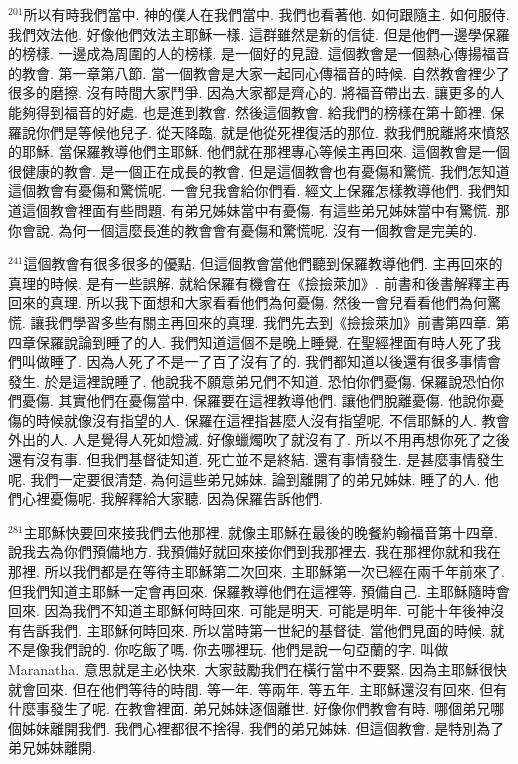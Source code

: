 \documentclass{book}
\begin{document}
$^{201}$所以有時我們當中.
神的僕人在我們當中.
我們也看著他.
如何跟隨主.
如何服侍.
我們效法他.
好像他們效法主耶穌一樣.
這群雖然是新的信徒.
但是他們一邊學保羅的榜樣.
一邊成為周圍的人的榜樣.
是一個好的見證.
這個教會是一個熱心傳揚福音的教會.
第一章第八節.
當一個教會是大家一起同心傳福音的時候.
自然教會裡少了很多的磨擦.
沒有時間大家鬥爭.
因為大家都是齊心的.
將福音帶出去.
讓更多的人能夠得到福音的好處.
也是進到教會.
然後這個教會.
給我們的榜樣在第十節裡.
保羅說你們是等候他兒子.
從天降臨.
就是他從死裡復活的那位.
救我們脫離將來憤怒的耶穌.
當保羅教導他們主耶穌.
他們就在那裡專心等候主再回來.
這個教會是一個很健康的教會.
是一個正在成長的教會.
但是這個教會也有憂傷和驚慌.
我們怎知道這個教會有憂傷和驚慌呢.
一會兒我會給你們看.
經文上保羅怎樣教導他們.
我們知道這個教會裡面有些問題.
有弟兄姊妹當中有憂傷.
有這些弟兄姊妹當中有驚慌.
那你會說.
為何一個這麼長進的教會會有憂傷和驚慌呢.
沒有一個教會是完美的.

$^{241}$這個教會有很多很多的優點.
但這個教會當他們聽到保羅教導他們.
主再回來的真理的時候.
是有一些誤解.
就給保羅有機會在《撿撿萊加》.
前書和後書解釋主再回來的真理.
所以我下面想和大家看看他們為何憂傷.
然後一會兒看看他們為何驚慌.
讓我們學習多些有關主再回來的真理.
我們先去到《撿撿萊加》前書第四章.
第四章保羅說論到睡了的人.
我們知道這個不是晚上睡覺.
在聖經裡面有時人死了我們叫做睡了.
因為人死了不是一了百了沒有了的.
我們都知道以後還有很多事情會發生.
於是這裡說睡了.
他說我不願意弟兄們不知道.
恐怕你們憂傷.
保羅說恐怕你們憂傷.
其實他們在憂傷當中.
保羅要在這裡教導他們.
讓他們脫離憂傷.
他說你憂傷的時候就像沒有指望的人.
保羅在這裡指甚麼人沒有指望呢.
不信耶穌的人.
教會外出的人.
人是覺得人死如燈滅.
好像蠟燭吹了就沒有了.
所以不用再想你死了之後還有沒有事.
但我們基督徒知道.
死亡並不是終結.
還有事情發生.
是甚麼事情發生呢.
我們一定要很清楚.
為何這些弟兄姊妹.
論到離開了的弟兄姊妹.
睡了的人.
他們心裡憂傷呢.
我解釋給大家聽.
因為保羅告訴他們.

$^{281}$主耶穌快要回來接我們去他那裡.
就像主耶穌在最後的晚餐約翰福音第十四章.
說我去為你們預備地方.
我預備好就回來接你們到我那裡去.
我在那裡你就和我在那裡.
所以我們都是在等待主耶穌第二次回來.
主耶穌第一次已經在兩千年前來了.
但我們知道主耶穌一定會再回來.
保羅教導他們在這裡等.
預備自己.
主耶穌隨時會回來.
因為我們不知道主耶穌何時回來.
可能是明天.
可能是明年.
可能十年後神沒有告訴我們.
主耶穌何時回來.
所以當時第一世紀的基督徒.
當他們見面的時候.
就不是像我們說的.
你吃飯了嗎.
你去哪裡玩.
他們是說一句亞蘭的字.
叫做Maranatha.
意思就是主必快來.
大家鼓勵我們在橫行當中不要緊.
因為主耶穌很快就會回來.
但在他們等待的時間.
等一年.
等兩年.
等五年.
主耶穌還沒有回來.
但有什麼事發生了呢.
在教會裡面.
弟兄姊妹逐個離世.
好像你們教會有時.
哪個弟兄哪個姊妹離開我們.
我們心裡都很不捨得.
我們的弟兄姊妹.
但這個教會.
是特別為了弟兄姊妹離開.
\end{document}
